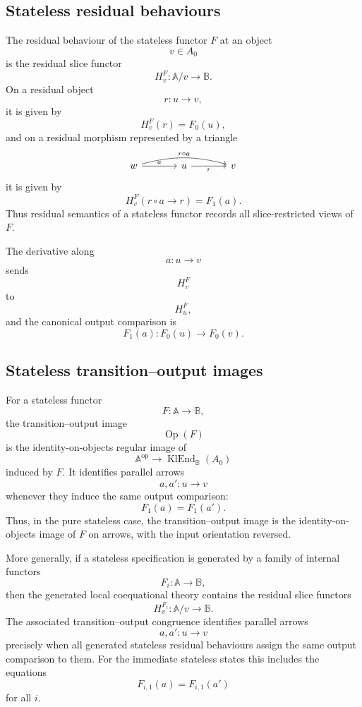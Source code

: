 \subsection{Stateless residual behaviours}
\label{subsec:to-stateless-residual-behaviours}

The residual behaviour of the stateless functor \(F\) at an object
\[
    v\in A_0
\]
is the residual slice functor
\[
    H^F_v:\mathbb A/v\to\mathbb B.
\]
On a residual object
\[
    r:u\to v,
\]
it is given by
\[
    H^F_v(r)=F_0(u),
\]
and on a residual morphism represented by a triangle
\[
\begin{tikzcd}[column sep=large, row sep=large]
    w
        \arrow[r, "a"]
        \arrow[rr, "r\circ a", bend left=15]
    &
    u
        \arrow[r, "r"']
    &
    v
\end{tikzcd}
\]
it is given by
\[
    H^F_v(r\circ a\to r)=F_1(a).
\]
Thus residual semantics of a stateless functor records all slice-restricted
views of \(F\).

The derivative along
\[
    a:u\to v
\]
sends
\[
    H^F_v
\]
to
\[
    H^F_u,
\]
and the canonical output comparison is
\[
    F_1(a):F_0(u)\to F_0(v).
\]

\subsection{Stateless transition--output images}
\label{subsec:to-stateless-operation-images}

For a stateless functor
\[
    F:\mathbb A\to\mathbb B,
\]
the transition--output image
\[
    \operatorname{Op}(F)
\]
is the identity-on-objects regular image of
\[
    \mathbb A^{\mathrm{op}}
    \to
    \operatorname{KlEnd}_{\mathbb B}(A_0)
\]
induced by \(F\). It identifies parallel arrows
\[
    a,a':u\to v
\]
whenever they induce the same output comparison:
\[
    F_1(a)=F_1(a').
\]
Thus, in the pure stateless case, the transition--output image is the
identity-on-objects image of \(F\) on arrows, with the input orientation
reversed.

More generally, if a stateless specification is generated by a family of
internal functors
\[
    F_i:\mathbb A\to\mathbb B,
\]
then the generated local coequational theory contains the residual slice
functors
\[
    H^{F_i}_v:\mathbb A/v\to\mathbb B.
\]
The associated transition--output congruence identifies parallel arrows
\[
    a,a':u\to v
\]
precisely when all generated stateless residual behaviours assign the same
output comparison to them. For the immediate stateless states this includes
the equations
\[
    F_{i,1}(a)=F_{i,1}(a')
\]
for all \(i\).

